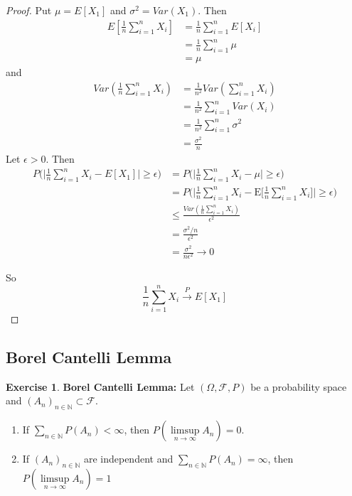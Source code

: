 \documentclass[12pt]{amsart}
\theoremstyle{definition}
\newtheorem{ex}[definition]{Exercise}
\newcommand{\ep}{\epsilon}
\newcommand{\sig}{\sigma}
\newcommand{\Om}{\Omega}
\newcommand{\N}{\mathbb{N}}
\newcommand{\MF}{\mathcal{F}}
\newcommand{\E}{\text{E}}
\newcommand{\limpn}{\limsup \limits_{n \rightarrow \infty}}
\newcommand{\conv}[1]{\xrightarrow{#1}}
\begin{document}
	\begin{proof}
		Put $\mu = E[X_1]$ and $\sig^2 = Var(X_1)$. Then 
		\begin{align*}
			E[\frac{1}{n}\sum_{i=1}^n X_i] 
			&= \frac{1}{n} \sum_{i=1}^nE[X_i] \\
			&= \frac{1}{n} \sum_{i=1}^n \mu \\
			&= \mu
		\end{align*} and 
		\begin{align*}
			Var(\frac{1}{n}\sum_{i=1}^n X_i) 
			&= \frac{1}{n^2} Var(\sum_{i=1}^n X_i) \\
			&= \frac{1}{n^2} \sum_{i=1}^n Var(X_i) \\
			&= \frac{1}{n^2} \sum_{i=1}^n \sig^2 \\
			&= \frac{\sig^2}{n}
		\end{align*}
		Let $\ep >0$. Then 
		\begin{align*}
			P\bigg(\bigg \vert \frac{1}{n} \sum_{i=1}^n X_i - E[X_1] \bigg \vert \geq \ep \bigg) 
			& = P\bigg(\bigg\vert \frac{1}{n} \sum_{i=1}^n X_i - \mu \bigg\vert \geq \ep\bigg) \\
			& = P\bigg(\bigg\vert \frac{1}{n} \sum_{i=1}^n X_i - \E\bigg[\frac{1}{n}\sum_{i=1}^n X_i \bigg] \bigg\vert \geq \ep\bigg) \\ 
			&\leq \frac{Var(\frac{1}{n} \sum_{i=1}^n X_i)}{\ep^2} \\
			& =  \frac{\sig^2 / n}{\ep^2} \\
			&= \frac{\sig^2}{n\ep^2} \rightarrow 0
		\end{align*}
		
		So $$\frac{1}{n}\sum_{i=1}^n X_i \conv{P} E[X_1]$$
	\end{proof}
	
	
	
	
	
	
	
	
	
	
	
	
	
	
	\newpage
	\subsection{Borel Cantelli Lemma} 
	
	\begin{ex}\textbf{Borel Cantelli Lemma:}
		Let $(\Om, \MF, P)$ be a probability space and $(A_n)_{n \in \N} \subset \MF$.
		\begin{enumerate}
			\item If $\sum\limits_{n \in \N}P(A_n) < \infty$, then $P(\limpn A_n) = 0$.
			\item If $(A_n)_{n \in \N}$ are independent and $\sum\limits_{n \in \N} P(A_n) = \infty$, then $P( \limpn A_n) = 1$  
		\end{enumerate}
	\end{ex}
	
\end{document}
